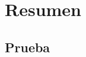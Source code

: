 \documentclass[a4paper,12pt]{report}
\title{\Titulo}
\author{\Autor}
\begin{document}







\newpage
\part{Resumen}
\chapter{Prueba}



\tableofcontents
\listoffigures
\listoftables
\end{document}
